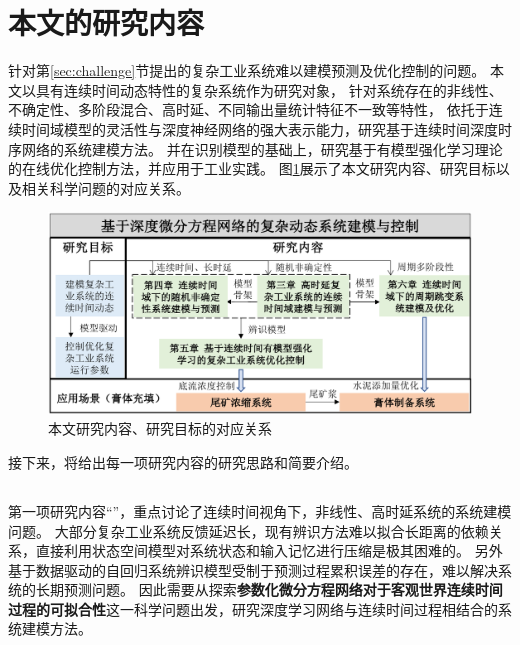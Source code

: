 \section{本文的研究内容}
针对第\ref{sec:challenge}节提出的复杂工业系统难以建模预测及优化控制的问题。
本文以具有连续时间动态特性的复杂系统作为研究对象，
针对系统存在的非线性、不确定性、多阶段混合、高时延、不同输出量统计特征不一致等特性，
依托于连续时间域模型的灵活性与深度神经网络的强大表示能力，研究基于连续时间深度时序网络的系统建模方法。
并在识别模型的基础上，研究基于有模型强化学习理论的在线优化控制方法，并应用于工业实践。
图\ref{fig:study_goal}展示了本文研究内容、研究目标以及相关科学问题的对应关系。
\begin{figure}[h]
    \includegraphics[width=\linewidth]{figures/chapter1/study_goal.pdf}
    \caption{本文研究内容、研究目标的对应关系}
    \label{fig:study_goal}
\end{figure}
接下来，将给出每一项研究内容的研究思路和简要介绍。

\subsection{\TitlechapterI}
第一项研究内容“\TitlechapterI”，重点讨论了连续时间视角下，非线性、高时延系统的系统建模问题。
大部分复杂工业系统反馈延迟长，现有辨识方法难以拟合长距离的依赖关系，直接利用状态空间模型对系统状态和输入记忆进行压缩是极其困难的。
另外基于数据驱动的自回归系统辨识模型受制于预测过程累积误差的存在，难以解决系统的长期预测问题。
因此需要从探索\textbf{参数化微分方程网络对于客观世界连续时间过程的可拟合性}这一科学问题出发，研究深度学习网络与连续时间过程相结合的系统建模方法。

